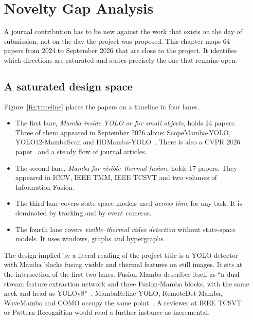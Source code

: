 \chapter{Novelty Gap Analysis}
\label{ch:novelty}

A journal contribution has to be new against the work that exists on the day
of submission, not on the day the project was proposed. This chapter maps 64
papers from 2024 to September 2026 that are close to the project. It
identifies which directions are saturated and states precisely the one that
remains open.

\section{A saturated design space}
\label{sec:saturated}

Figure~\ref{fig:timeline} places the papers on a timeline in four lanes.
\begin{itemize}
  \item The first lane, \emph{Mamba inside YOLO or for small objects},
        holds 24 papers. Three of them appeared in September 2026 alone:
        ScopeMamba-YOLO, YOLO12-MambaScan and HDMamba-YOLO~\citep{scopemamba2026,yolo12mambascan2026,hdmambayolo2026}.
        There is also a CVPR 2026 paper~\citep{akcmamba2026} and a steady
        flow of journal articles.
  \item The second lane, \emph{Mamba for visible--thermal fusion}, holds 17
        papers. They appeared in ICCV, IEEE TMM, IEEE TCSVT and two volumes
        of Information Fusion.
  \item The third lane covers state-space models used \emph{across time} for
        any task. It is dominated by tracking and by event cameras.
  \item The fourth lane covers \emph{visible--thermal video detection}
        without state-space models. It uses windows, graphs and hypergraphs.
\end{itemize}

The design implied by a literal reading of the project title is a YOLO
detector with Mamba blocks fusing visible and thermal features on still
images. It sits at the intersection of the first two lanes. Fusion-Mamba
describes itself as ``a dual-stream feature extraction network and three
Fusion-Mamba blocks, with the same neck and head as
YOLOv8''~\citep{dong2025fusionmamba}. MambaRefine-YOLO, RemoteDet-Mamba,
WaveMamba and COMO occupy the same point~\citep{mambarefine2025,remotedetmamba2024,wavemamba2025,como2024}.
A reviewer at IEEE TCSVT or Pattern Recognition would read a further
instance as incremental.

